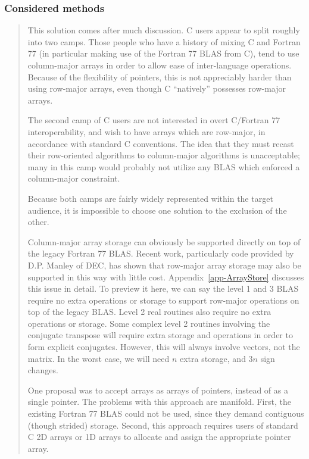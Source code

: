 \documentclass{article}
\begin{document}
\subsubsection{Considered methods}
{\it
\begin{quotation}
This solution comes after much discussion.  C users appear to split roughly
into two camps.  Those people who have a history
of mixing C and Fortran 77 (in particular making use of the Fortran 77 BLAS
from C), tend to use column-major arrays in order to allow ease of
inter-language operations.  Because of the flexibility of pointers, this
is not appreciably harder than using row-major arrays, even though C
``natively'' possesses row-major arrays.

The second camp of C users 
are not interested in overt C/Fortran 77 interoperability, and wish to 
have arrays which are row-major, in accordance with standard C conventions.
The idea that they must recast their row-oriented algorithms to column-major
algorithms is unacceptable; many in this camp would probably not utilize
any BLAS which enforced a column-major constraint.

Because both camps are fairly widely represented within the target
audience, it is impossible to choose one solution to the exclusion of
the other.

Column-major array storage can obviously be supported directly on top of
the legacy Fortran 77 BLAS.  Recent work, particularly code provided
by D.P. Manley of DEC, has shown that row-major array storage may also
be supported in this way with little cost.  Appendix~\ref{app-ArrayStore}
discusses this issue in detail.  To preview it here, we can say the level
1 and 3 BLAS require no extra operations or storage to support row-major
operations on top of the legacy BLAS.  Level 2 real routines also require
no extra operations or storage.  Some complex level 2 routines involving
the conjugate transpose will require extra storage and operations in order
to form explicit conjugates.  However, this will always involve vectors,
not the matrix.  In the worst case, we will need $n$ extra storage, and
$3n$ sign changes.

One proposal was to accept arrays as arrays of pointers, instead of as
a single pointer.  
The problems with this approach are manifold.  First,
the existing Fortran 77 BLAS could not be used, since they demand contiguous
(though strided) storage.  Second, this approach requires users of standard
C 2D arrays or 1D arrays to allocate and assign the appropriate pointer array.


\end{quotation}}
\end{document}
